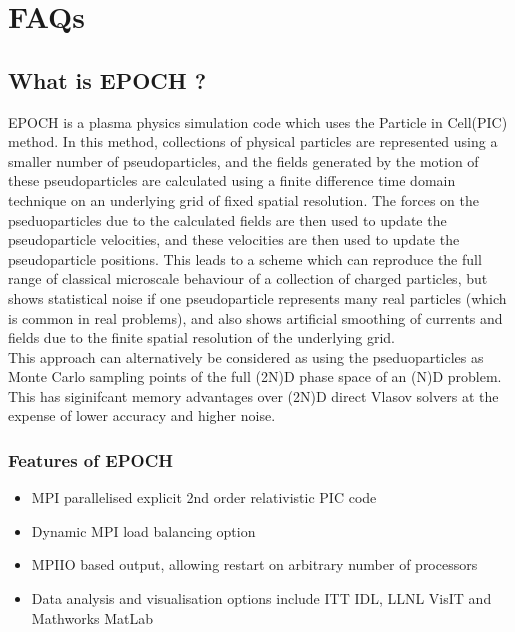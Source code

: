 \documentclass[12pt]{article}
\newcommand{\EPOCH}{{\color{warwickdark}\fontfamily{phv}\selectfont EPOCH} }
\begin{document}
{
  \selectfont
  
}
\selectfont
\tableofcontents
\newpage

\section{FAQs}

\subsection{What is \EPOCH?}
\EPOCH is a plasma physics simulation code which uses the Particle in Cell(PIC)
method. In this method, collections of physical particles are represented using
a smaller number of pseudoparticles, and the fields generated by the motion of
these pseudoparticles are calculated using a finite difference time domain
technique on an underlying grid of fixed spatial resolution. The forces on the
pseduoparticles due to the calculated fields are then used to update the
pseudoparticle velocities, and these velocities are then used to update the
pseudoparticle positions. This leads to a scheme which can reproduce the full
range of classical microscale behaviour of a collection of charged particles,
but shows statistical noise if one pseudoparticle represents many real
particles (which is common in real problems), and also shows artificial
smoothing of currents and fields due to the finite spatial resolution of the
underlying grid.\\

This approach can alternatively be considered as using the pseduoparticles as
Monte Carlo sampling points of the full (2N)D phase space of an (N)D
problem. This has siginifcant memory advantages over (2N)D direct Vlasov
solvers at the expense of lower accuracy and higher noise.

\subsubsection{Features of \EPOCH}
\begin{itemize}
  \item MPI parallelised explicit 2nd order relativistic PIC code
  \item Dynamic MPI load balancing option
  \item MPIIO based output, allowing restart on arbitrary number of processors
  \item Data analysis and visualisation options include ITT IDL, LLNL VisIT
    and Mathworks MatLab
\end{itemize}
\end{document}
